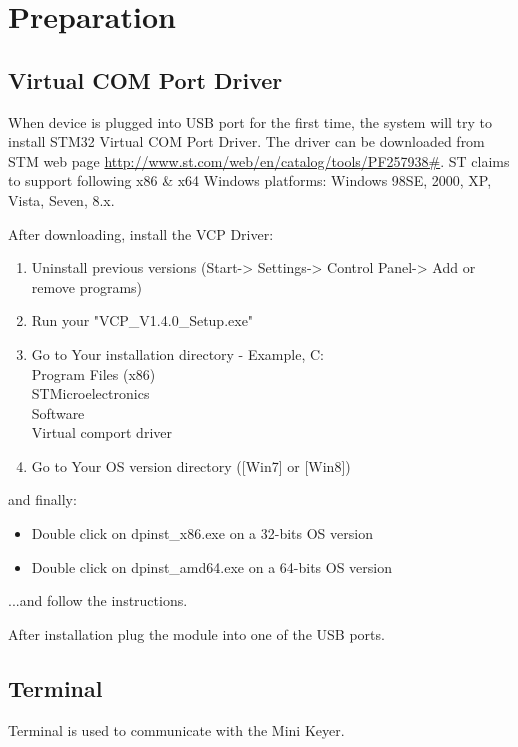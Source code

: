 \documentclass{tufte-book} %
\begin{document}

\mainmatter



\chapter{Preparation}
\label{ch:0}
\section{Virtual COM Port Driver}
When device is plugged into USB port for the first time, the system will try to install STM32 Virtual COM Port Driver. 
The driver can be downloaded from STM web page \url{http://www.st.com/web/en/catalog/tools/PF257938#}. ST claims to support following x86 \& x64 Windows platforms: Windows 98SE, 2000, XP, Vista, Seven, 8.x. 

After downloading, install the VCP Driver:
\begin{enumerate}
	\item Uninstall previous versions (Start-> Settings-> Control Panel-> Add or remove programs)
	\item Run your "VCP\_V1.4.0\_Setup.exe"
	\item Go to Your installation directory - Example, C:\\Program Files (x86)\\STMicroelectronics\\Software\\Virtual comport driver
	\item Go to Your OS version directory ([Win7] or [Win8])
\end{enumerate}
   and finally:      
\begin{itemize}
	\item Double click on dpinst\_x86.exe on a 32-bits OS version
	\item Double click on dpinst\_amd64.exe on a 64-bits OS version
\end{itemize}      
...and follow the instructions.

After installation plug the module into one of the USB ports. 

\section{Terminal}
Terminal is used to communicate with the Mini Keyer. 
\end{document}
